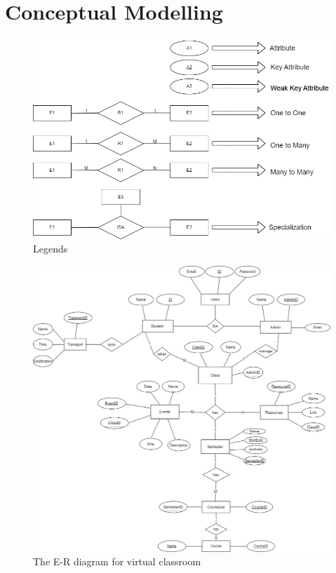 \section{Conceptual Modelling}\label{sec:cm}

\begin{figure}[h]

\centering
\includegraphics[scale=.5]{info1u}

\caption{Legends}
\end{figure}

\clearpage

\begin{figure}[h]

\centering
\includegraphics[scale=.4]{er2}

\caption{The E-R diagram for virtual classroom }
\end{figure}
 
